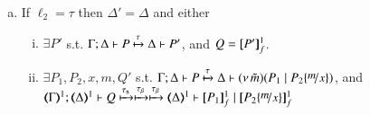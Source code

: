 \begin{proposition}
\begin{enumerate}[1.]
\begin{enumerate}[a)]
				\item 
					If $\ell_2 = \tau$ 
					then $\Delta' = \Delta$ and 
					either
%
					\begin{enumerate}[(i)]
						\item	$\exists P'$ s.t. 
							$\Gamma; \Delta \vdash P \xmapsto{\tau} \Delta \vdash P'$,
							and $Q = [\!\![P']\!\!]^{1}_f$.	

						\item
							$\exists P_1, P_2, x, m, Q'$ s.t. 
							$\horel{\Gamma}{\Delta}{P}{\hby{\tau}}{\Delta}{\newsp{\tilde{m}}{P_1 \Par P_2\subst{m}{x}} }$, and\\
							$\horel{\tmap{\Gamma}{1}}{\tmap{\Delta}{1}}{Q}{\hby{\stau} \hby{\btau} \hby{\btau}}{\tmap{\Delta}{1}}{\pmapp{P_1}{1}{f} \Par \pmapp{P_2\subst{m}{x}}{1}{f}}$ 

			\end{enumerate}
		    \end{enumerate}
		    
	\end{enumerate}
\end{proposition}


